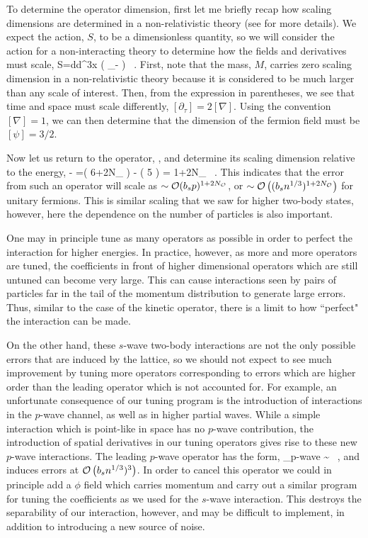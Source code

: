 To determine the operator dimension, first let me briefly recap how scaling dimensions are determined in a non-relativistic theory (see \cite{Kaplan:2005es} for more details). We expect the action, $S$, to be a dimensionless quantity, so we will consider the action for a non-interacting theory to determine how the fields and derivatives must scale,
\beq
S=\int d\tau d^3x \psidag \left( \partial_{\tau}- \right) \psi \ .
\eeq
First, note that the mass, $M$, carries zero scaling dimension in a non-relativistic theory because it is considered to be much larger than any scale of interest. Then, from the expression in parentheses, we see that time and space must scale differently, $[\partial_{\tau}] = 2 [\nabla]$. Using the convention $[\nabla]=1$, we can then determine that the dimension of the fermion field must be $[\psi]=3/2$. 

Now let us return to the operator, , and determine its scaling dimension relative to the energy,
\beq
{} - \left[\psidag \partial_{\tau} \psi \right] =( 6+2N_{\calO} ) - ( 5 ) = 1+2N_{\calO} \ .
\eeq
This indicates that the error from such an operator will scale as $\sim {\mathcal{ O}}(b_s p)^{1+2N_{{\mathcal{ O}}}}$, or $\sim {\mathcal{ O}}\left((b_s n^{1/3})^{1+2N_{{\mathcal{ O}}}}\right)$ for unitary fermions. This is similar scaling that we saw for higher two-body states, however, here the dependence on the number of particles is also important.

One may in principle tune as many operators as possible in order to perfect the interaction for higher energies. In practice, however, as more and more operators are tuned, the coefficients in front of higher dimensional operators which are still untuned can become very large. This can cause interactions seen by pairs of particles far in the tail of the momentum distribution to generate large errors. Thus, similar to the case of the kinetic operator, there is a limit to how ``perfect" the interaction can be made. 

On the other hand, these $s$-wave two-body interactions are not the only possible errors that are induced by the lattice, so we should not expect to see much improvement by tuning more operators corresponding to errors which are higher order than the leading operator which is not accounted for. For example, an unfortunate consequence of our tuning program is the introduction of interactions in the $p$-wave channel, as well as in higher partial waves. While a simple interaction which is point-like in space has no $p$-wave contribution, the introduction of spatial derivatives in our tuning operators gives rise to these new $p$-wave interactions. The leading $p$-wave operator has the form,
\beq
\calO_{p\mbox{\tiny -wave}} \sim \psidag \vec{\nabla} \psi \cdot \psidag \vec{\nabla} \psi \ ,
\eeq
and induces errors at ${\mathcal{ O}}\left(b_s n^{1/3})^{3}\right)$. In order to cancel this operator we could in principle add a $\phi$ field which carries momentum and carry out a similar program for tuning the coefficients as we used for the $s$-wave interaction. This destroys the separability of our interaction, however, and may be difficult to implement, in addition to introducing a new source of noise.


